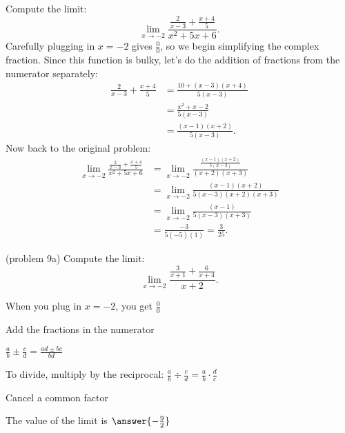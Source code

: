 \documentclass[handout]{ximera}
\begin{document}
\begin{example}[example 9]
Compute the limit:
\[\lim_{x \to -2} \frac{\frac{2}{x-3} + \frac{x+4}{5}}{x^2 + 5x + 6}.\]
Carefully plugging in $x=-2$ gives $\frac00$, so we begin simplifying the complex fraction.
Since this function is bulky, let's do the addition of fractions from the numerator separately:
\begin{align*}
\frac{2}{x-3} + \frac{x+4}{5} &= \frac{10 + (x-3)(x+4)}{5(x-3)}\\[.4 em]
&= \frac{x^2 +x -2}{5(x-3)} \\[.4 em]
&= \frac{(x-1)(x+2)}{5(x-3)}.
\end{align*}
Now back to the original problem:
\begin{align*}
\lim_{x \to -2} \frac{\frac{2}{x-3} + \frac{x+4}{5}}{x^2 + 5x + 6} &= 
\lim_{x \to -2} \frac{\frac{(x-1)(x+2)}{5(x-3)}}{(x+2)(x+3)}\\[.4 em]
&= \lim_{x \to -2} \frac{(x-1)(x+2)}{5(x-3)(x+2)(x+3)} \\[.4 em]
&= \lim_{x \to -2} \frac{(x-1)}{5(x-3)(x+3)}\\[.4 em]
&= \frac{-3}{5(-5)(1)} = \frac{3}{25}.
\end{align*}
\end{example}


\begin{problem}(problem 9a)
  Compute the limit:
  \[
  \lim_{x \to -2} \frac{\frac{3}{x+1} + \frac{6}{x+4}}{x+2}.
  \]
  
    \begin{hint}
      When you plug in $x = -2$, you get $\frac00$
    \end{hint}
    \begin{hint}
      Add the fractions in the numerator
    \end{hint}
    \begin{hint}
      $\frac{a}{b} \pm \frac{c}{d} = \frac{ad \pm bc}{bd}$
    \end{hint}
    \begin{hint}
      To divide, multiply by the reciprocal: $\frac{a}{b} \div \frac{c}{d} = \frac{a}{b} \cdot \frac{d}{c}$
    \end{hint}
    \begin{hint}
      Cancel a common factor 
    \end{hint}
		The value of the limit is
		 $\answer{-\frac{9}{2}}$
		
\end{problem}
\end{document}
